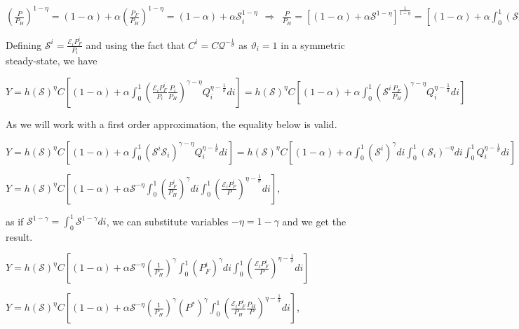 \documentclass[
]{article}
\begin{document}
\(\displaystyle \left( \frac{P}{P_H} \right)^{1-\eta} = (1-\alpha) + \alpha \left( \frac{P_F}{P_H}\right)^{1-\eta} = (1-\alpha) + \alpha \mathcal{S}_i^{1-\eta} \ \ \Rightarrow \ \ \frac{P}{P_H}=\left[ (1-\alpha)+\alpha \mathcal{S}^{1-\eta}\right]^{\frac{1}{1-\eta}}= \left[ (1-\alpha) + \alpha \int_0^1(\mathcal{S}_i)^{1-\eta}di \right]^{\frac{1}{1-\eta}} \equiv h(\mathcal{S})\)

Defining
\(\displaystyle \mathcal{S}^i = \frac{\mathcal{E}_i P_F^i}{P_i}\) and
using the fact that
\(\displaystyle C^i=C \mathcal{Q}^{-\frac{1}{\sigma}}\) as
\(\vartheta_i = 1\) in a symmetric steady-state, we have

\(\displaystyle Y = h(\mathcal{S})^{\eta}C \left[ (1-\alpha) + \alpha \int_0^1 \left( \frac{ \mathcal{E}_i P_F^i }{P_i} \frac{P_i}{P_H} \right)^{\gamma-\eta} Q_i^{\eta-\frac{1}{\sigma}} di \right]= h(\mathcal{S})^{\eta}C \left[ (1-\alpha) + \alpha \int_0^1 \left( \mathcal{S}^i \frac{P_F}{P_H} \right)^{\gamma-\eta} Q_i^{\eta-\frac{1}{\sigma}} di \right]\)

As we will work with a first order approximation, the equality below is
valid.

\(\displaystyle Y = h(\mathcal{S})^{\eta}C \left[ (1-\alpha) + \alpha \int_0^1 \left( \mathcal{S}^i \mathcal{S}_i \right)^{\gamma-\eta} Q_i^{\eta-\frac{1}{\sigma}} di \right] = h(\mathcal{S})^{\eta}C \left[ (1-\alpha) + \alpha \int_0^1 ( \mathcal{S}^i)^{\gamma} di \int_0^1 ( \mathcal{S}_i)^{-\eta} di \int_0^1 Q_i^{\eta-\frac{1}{\sigma}} di \right]\)

\(\displaystyle Y = h(\mathcal{S})^{\eta}C \left[ (1-\alpha) + \alpha \mathcal{S}^{-\eta} \int_0^1 \left( \frac{P_F^i}{P_H} \right)^{\gamma} di \int_0^1 \left( \frac{\mathcal{E}_i P_F^i}{P} \right)^{\eta-\frac{1}{\sigma}} di \right]\),

as if
\(\displaystyle \mathcal{S}^{1-\gamma}=\int_0^1 \mathcal{S}^{1-\gamma}di\),
we can substitute variables \(-\eta=1-\gamma\) and we get the result.

\(\displaystyle Y = h(\mathcal{S})^{\eta}C \left[ (1-\alpha) + \alpha \mathcal{S}^{-\eta} \left( \frac{1}{P_H} \right)^{\gamma} \int_0^1 \left( P_F^i \right)^{\gamma} di \int_0^1 \left( \frac{\mathcal{E}_i P_F^i}{P} \right)^{\eta-\frac{1}{\sigma}} di \right]\)

\(\displaystyle Y= h(\mathcal{S})^{\eta}C \left[ (1-\alpha) + \alpha \mathcal{S}^{-\eta} \left( \frac{1}{P_H} \right)^{\gamma} (P^*)^{\gamma} \int_0^1 \left( \frac{\mathcal{E}_i P_F^i}{P_H} \frac{P_H}{P} \right)^{\eta-\frac{1}{\sigma}} di \right]\),
\end{document}
